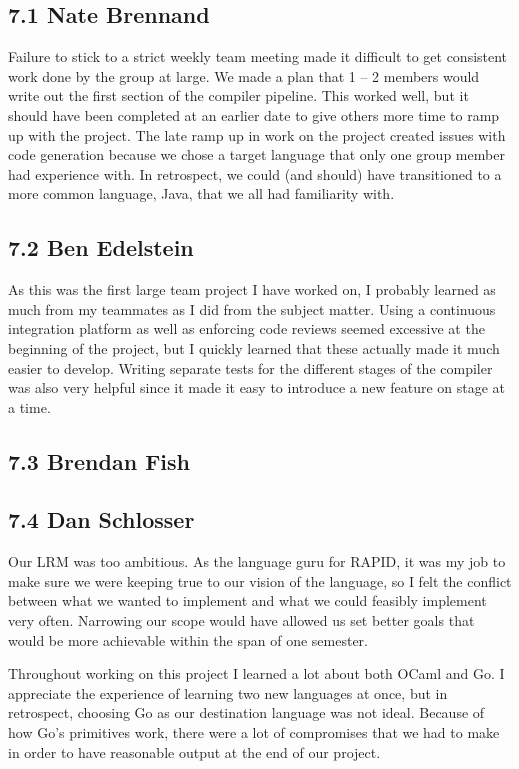 
\subsection*{7.1 Nate Brennand}

Failure to stick to a strict weekly team meeting made it difficult to get consistent work done by the group at large.
We made a plan that 1 – 2 members would write out the first section of the compiler pipeline.
This worked well, but it should have been completed at an earlier date to give others more time to ramp up with the project.
The late ramp up in work on the project created issues with code generation because we chose a target language that only one group member had experience with.
In retrospect, we could (and should) have transitioned to a more common language, Java, that we all had familiarity with.

\subsection*{7.2 Ben Edelstein}

As this was the first large team project I have worked on, I probably learned as much from my teammates as I did from the subject matter. Using a continuous integration platform as well as enforcing code reviews seemed excessive at the beginning of the project, but I quickly learned that these actually made it much easier to develop. Writing separate tests for the different stages of the compiler was also very helpful since it made it easy to introduce a new feature on stage at a time.


\subsection*{7.3 Brendan Fish}

\subsection*{7.4 Dan Schlosser}

Our LRM was too ambitious.  As the language guru for RAPID, it was my job to make
sure we were keeping true to our vision of the language, so I felt the conflict
between what we wanted to implement and what we could feasibly implement very
often.  Narrowing our scope would have allowed us set better goals that would be
more achievable within the span of one semester.

Throughout working on this project I learned a lot about both OCaml and Go.  I
appreciate the experience of learning two new languages at once, but in
retrospect, choosing Go as our destination language was not ideal.  Because of
how Go's primitives work, there were a lot of compromises that we had to make
in order to have reasonable output at the end of our project.

